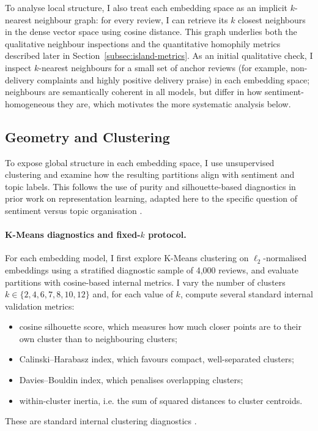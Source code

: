 \documentclass[a4paper,11pt]{article}
\begin{document}
To analyse local structure, I also treat each embedding space as an implicit $k$-nearest neighbour graph: 
for every review, I can retrieve its $k$ closest neighbours in the dense vector space using cosine distance. 
This graph underlies both the qualitative neighbour inspections and the quantitative homophily metrics described later in Section~\ref{subsec:island-metrics}. 
As an initial qualitative check, I inspect $k$-nearest neighbours for a small set of anchor reviews (for example, non-delivery complaints and highly positive delivery praise) in each embedding space; neighbours are semantically coherent in all models, but differ in how sentiment-homogeneous they are, which motivates the more systematic analysis below.

\subsection{Geometry and Clustering}
\label{subsec:geometry-clustering}

To expose global structure in each embedding space, I use unsupervised clustering and examine how the resulting partitions align with sentiment and topic labels. 
This follows the use of purity and silhouette-based diagnostics in prior work on representation learning, adapted here to the specific question of sentiment versus topic organisation \citep{manning-ir-book}.

\paragraph{K-Means diagnostics and fixed-$k$ protocol.}

For each embedding model, I first explore K-Means clustering on $\ell_2$-normalised embeddings using a stratified diagnostic sample of 4{,}000 reviews, and evaluate partitions with cosine-based internal metrics. 
I vary the number of clusters $k \in \{2,4,6,7,8,10,12\}$ and, for each value of $k$, compute several standard internal validation metrics:

\begin{itemize}
    \item cosine silhouette score, which measures how much closer points are to their own cluster than to neighbouring clusters;
    \item Calinski--Harabasz index, which favours compact, well-separated clusters;
    \item Davies--Bouldin index, which penalises overlapping clusters;
    \item within-cluster inertia, i.e. the sum of squared distances to cluster centroids.
\end{itemize}
These are standard internal clustering diagnostics \citep{rousseeuw-silhouette,calinski-harabasz,davies-bouldin}.
\end{document}
